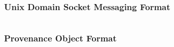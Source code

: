 \subsubsection{Unix Domain Socket Messaging Format}
\label{ProvProt}
\inputminted{protobuf}{../src/protobuf/uds_msg.proto}

\subsubsection{Provenance Object Format}
\label{POF}
\inputminted{protobuf}{../src/protobuf/prov_db.proto}
